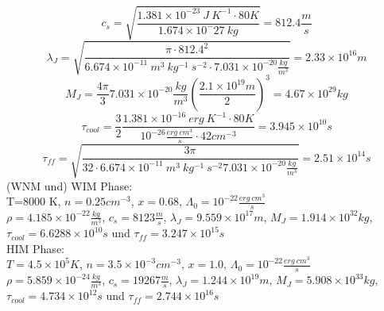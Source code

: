 \begin{equation}
c_{s}=\sqrt{\frac{ 1.381 \times 10^{-23}~J~K^{-1}\cdot 80 K}{1.674 \times 10^-27~kg}} = 812.4 \frac{m}{s}
\end{equation}
\begin{equation}
\lambda_{J}=\sqrt{\frac{\pi \cdot 812.4^2}{6.674 \times 10^{-11}~m^3~kg^{-1}~s^{-2} \cdot 7.031 \times 10^{-20} \frac{kg}{m^3}}} = 2.33 \times 10^{16} m
\end{equation}
\begin{equation}
M_{J}=\frac{4 \pi}{3} 7.031 \times 10^{-20} \frac{kg}{m^3} \left ( \frac{2.1 \times 10^{19} m}{2} \right)^3 = 4.67 \times 10^{29} kg
\end{equation}
\begin{equation}
\tau_{cool}=\frac{3}{2} \frac{1.381 \times 10^{-16}~erg~K^{-1} \cdot 80 K}{10^{-26} \frac{erg~cm^3}{s} \cdot 42 cm^{-3}} = 3.945 \times 10^{10} s
\end{equation}
\begin{equation}
\tau_{ff}= \sqrt{\frac{3 \pi}{32 \cdot 6.674 \times 10^{-11}~m^3~kg^{-1}~s^{-2} 7.031 \times 10^{-20} \frac{kg}{m^3}}} = 2.51 \times 10^{14} s
\end{equation}
(WNM und) WIM Phase: \\
T=8000 K, $n = 0.25 cm^{-3}$, $x=0.68$, $\Lambda_0 = 10^{-22} \frac{erg~cm^3}{s}$\\
$\rho= 4.185 \times 10^{-22} \frac{kg}{m^3}$, $c_{s}=8123 \frac{m}{s}$, $\lambda_{J}= 9.559 \times 10^{17} m$, $M_{J}= 1.914 \times 10^{32} kg$, $\tau_{cool} = 6.6288 \times 10^{10} s$ und $\tau_{ff} = 3.247 \times 10^{15} s$\\
HIM Phase: \\
$T=4.5 \times 10^{5} K$, $n = 3.5 \times 10^{-3} cm^{-3}$, $x=1.0$, $\Lambda_0 = 10^{-22} \frac{erg~cm^3}{s}$\\
$\rho= 5.859 \times 10^{-24} \frac{kg}{m^3}$, $c_{s}=19267 \frac{m}{s}$, $\lambda_{J}= 1.244 \times 10^{19} m$, $M_{J}= 5.908 \times 10^{33} kg$, $\tau_{cool} = 4.734 \times 10^{12} s$ und $\tau_{ff} = 2.744 \times 10^{16} s$\\
